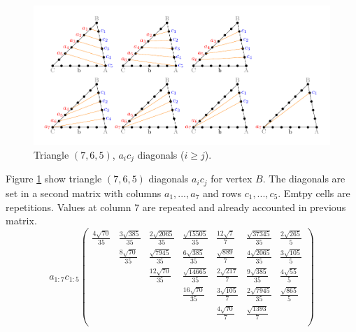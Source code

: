 \documentclass[11pt]{article}
\begin{document}
\begin{figure}[htp]
\centering
\includegraphics[scale=1]{t765ac}
\caption{Triangle $(7,6,5)$, $a_ic_j$ diagonals ($i \ge j$).}
\label{t765ac}
\end{figure}
Figure \ref{t765ac} show triangle $(7,6,5)$ diagonals $a_ic_j$ for vertex $B$. 
The diagonals are set in a second matrix with columns $a_1,...,a_7$ and rows $c_1,...,c_5$. Emtpy cells are repetitions.
Values at column 7 are repeated and already accounted in previous matrix.
\begin{equation}\label{eq:appendrow}
a_{1:7}c_{1:5}\left(\begin{array}{ccccccc}
\frac{4\sqrt{70}}{35} & \frac{3\sqrt{385}}{35} & \frac{2\sqrt{2065}}{35} & \frac{\sqrt{15505}}{35} & \frac{12\sqrt{7}}{7} & \frac{\sqrt{37345}}{35} & \frac{2\sqrt{265}}{5} \\
& \frac{8\sqrt{70}}{35} & \frac{\sqrt{7945}}{35} & \frac{6\sqrt{385}}{35} & \frac{\sqrt{889}}{7} & \frac{4\sqrt{2065}}{35} & \frac{3\sqrt{105}}{5} \\
& & \frac{12\sqrt{70}}{35} & \frac{\sqrt{14665}}{35} & \frac{2\sqrt{217}}{7} & \frac{9\sqrt{385}}{35} & \frac{4\sqrt{55}}{5} \\
& & & \frac{16\sqrt{70}}{35} & \frac{3\sqrt{105}}{7} & \frac{2\sqrt{7945}}{35} & \frac{\sqrt{865}}{5} \\
& & & & \frac{4\sqrt{70}}{7} & \frac{\sqrt{1393}}{7} & \\
\end{array}\right)
\end{equation}
\end{document}

